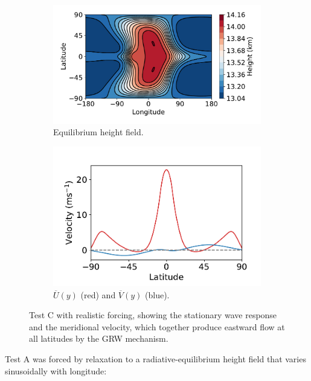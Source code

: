 \begin{figure}
  \centering
  \begin{subfigure}[t]{0.52\textwidth}
    \includegraphics[width=1.0\textwidth]{figures/eqm-zonal-flow/test-C-h.pdf}
    \caption{Equilibrium height field.}
    \label{fig:test-C-h}
  \end{subfigure}
  \begin{subfigure}[t]{0.47\textwidth}
    \includegraphics[width=1.0\textwidth]{figures/eqm-zonal-flow/test-C-u-v.pdf}
    \caption{$\overline{U}(y)$ (red) and $\overline{V}(y)$ (blue).}
    \label{fig:test-C-u-v}
  \end{subfigure}
  \caption{Test C with realistic forcing, showing the stationary wave response and the meridional velocity, which together produce eastward flow at all latitudes by the GRW mechanism.}
  \label{fig:nonlin-test-C}
\end{figure}


Test A was forced by relaxation to a radiative-equilibrium height field that varies sinusoidally with longitude:

